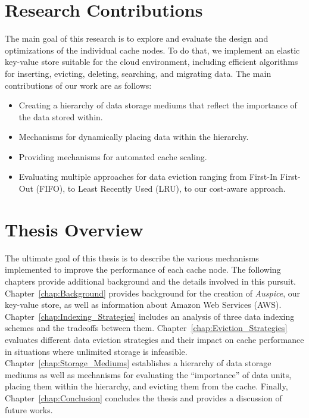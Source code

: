 \section{Research Contributions} %
\label{sec:Research_Contributions}
The main goal of this research is to explore and evaluate the design and
optimizations of the individual cache nodes. To do that, we implement an
elastic key-value store suitable for the cloud environment, including efficient
algorithms for inserting, evicting, deleting, searching, and migrating data.
The main contributions of our work are as follows:
\begin{itemize}
  \item Creating a hierarchy of data storage mediums that reflect the
    importance of the data stored within.
  \item Mechanisms for dynamically placing data within the hierarchy.
  \item Providing mechanisms for automated cache scaling.
  \item Evaluating multiple approaches for data eviction ranging from First-In
    First-Out (FIFO), to Least Recently Used (LRU), to our cost-aware approach.
\end{itemize}


\section{Thesis Overview} %
\label{sec:Thesis_Overview}
The ultimate goal of this thesis is to describe the various mechanisms
implemented to improve the performance of each cache node. The following
chapters provide additional background and the details involved in this
pursuit. Chapter~\ref{chap:Background} provides background for the creation of
\emph{Auspice}, our key-value store, as well as information about Amazon Web
Services (AWS). Chapter~\ref{chap:Indexing_Strategies} includes an analysis of
three data indexing schemes and the tradeoffs between them.
Chapter~\ref{chap:Eviction_Strategies} evaluates different data eviction
strategies and their impact on cache performance in situations where unlimited
storage is infeasible. Chapter~\ref{chap:Storage_Mediums} establishes a
hierarchy of data storage mediums as well as mechanisms for evaluating the
``importance'' of data units, placing them within the hierarchy, and evicting
them from the cache. Finally, Chapter~\ref{chap:Conclusion} concludes the
thesis and provides a discussion of future works.

